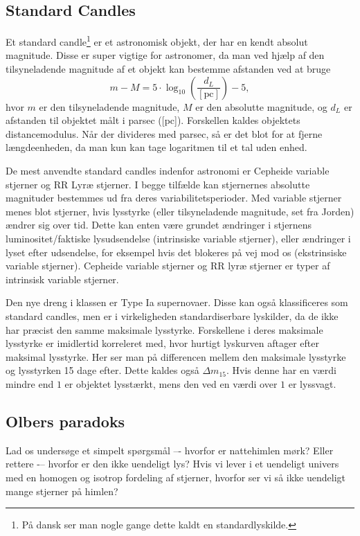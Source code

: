 \subsection{Standard Candles}

Et standard candle\footnote{På dansk ser man nogle gange dette kaldt en standardlyskilde.} er et astronomisk objekt, der har en kendt absolut magnitude. Disse er super vigtige for astronomer, da man ved hjælp af den tilsyneladende magnitude af et objekt kan bestemme afstanden ved at bruge
\begin{equation}
m-M=5\cdot \log_{10}\left(\frac{d_L}{[\text{pc}]}\right) - 5 ,
\end{equation}
hvor $m$ er den tilsyneladende magnitude, $M$ er den absolutte magnitude, og $d_L$ er afstanden til objektet målt i parsec ([pc]). Forskellen kaldes objektets distancemodulus. Når der divideres med parsec, så er det blot for at fjerne længdeenheden, da man kun kan tage logaritmen til et tal uden enhed.

De mest anvendte standard candles indenfor astronomi er Cepheide variable stjerner og RR Lyræ stjerner. I begge tilfælde kan stjernernes absolutte magnituder bestemmes ud fra deres variabilitetsperioder. Med variable stjerner menes blot stjerner, hvis lysstyrke (eller tilsyneladende magnitude, set fra Jorden) ændrer sig over tid. Dette kan enten være grundet ændringer i stjernens luminositet/faktiske lysudsendelse (intrinsiske variable stjerner), eller ændringer i lyset efter udsendelse, for eksempel hvis det blokeres på vej mod os (ekstrinsiske variable stjerner). Cepheide variable stjerner og RR lyræ stjerner er typer af intrinsisk variable stjerner. 

Den nye dreng i klassen er Type Ia supernovaer. Disse kan også klassificeres som standard candles, men er i virkeligheden standardiserbare lyskilder, da de ikke har præcist den samme maksimale lysstyrke. Forskellene i deres maksimale lysstyrke er imidlertid korreleret med, hvor hurtigt lyskurven aftager efter maksimal lysstyrke. Her ser man på differencen mellem den maksimale lysstyrke og lysstyrken 15 dage efter. Dette kaldes også $\Delta m_{15}$. Hvis denne har en værdi mindre end $1$ er objektet lysstærkt, mens den ved en værdi over $1$ er lyssvagt.

\subsection{Olbers paradoks}
Lad os undersøge et simpelt spørgsmål –- hvorfor er nattehimlen mørk? Eller rettere -– hvorfor er den ikke uendeligt lys? Hvis vi lever i et uendeligt univers med en homogen og isotrop fordeling af stjerner, hvorfor ser vi så ikke uendeligt mange stjerner på himlen?

